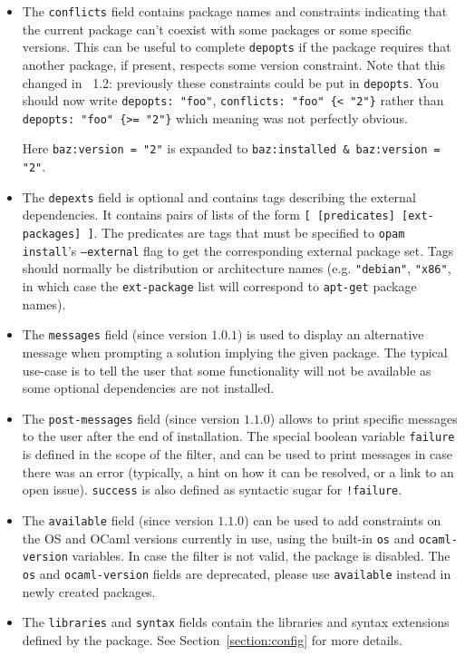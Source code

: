 \documentclass[a4paper,10pt]{article}
\begin{document}
\begin{itemize}
\item The {\tt conflicts} field contains package names and constraints
  indicating that the current package can't coexist with some packages or some
  specific versions. This can be useful to complete {\tt depopts} if the package
  requires that another package, if present, respects some version constraint.
  Note that this changed in \OPAM\ 1.2: previously these constraints could be
  put in {\tt depopts}. You should now write \verb+depopts: "foo"+,
  \verb+conflicts: "foo" {< "2"}+ rather than \verb+depopts: "foo" {>= "2"}+
  which meaning was not perfectly obvious.

Here \verb+baz:version = "2"+ is expanded to
\verb+baz:installed & baz:version = "2"+.

\item The {\tt depexts} field is optional and contains tags describing the
  external dependencies. It contains pairs of lists of the form
  \verb+[ [predicates] [ext-packages] ]+. The predicates are tags that must be
  specified to {\tt opam install}'s {\tt --external} flag to get the
  corresponding external package set. Tags should normally be distribution or
  architecture names (e.g. \verb+"debian"+, \verb+"x86"+, in which case the
  \verb+ext-package+ list will correspond to {\tt apt-get} package names).

\item The {\tt messages} field (since version $1.0.1$) is used to
  display an alternative message when prompting a solution implying
  the given package. The typical use-case is to tell the user that
  some functionality will not be available as some optional
  dependencies are not installed.

\item The {\tt post-messages} field (since version $1.1.0$) allows to print
  specific messages to the user after the end of installation. The special
  boolean variable \verb+failure+ is defined in the scope of the filter, and can
  be used to print messages in case there was an error (typically, a hint on how
  it can be resolved, or a link to an open issue). \verb+success+ is also
  defined as syntactic sugar for \verb+!failure+.

\item The {\tt available} field (since version $1.1.0$) can be used to add
  constraints on the OS and OCaml versions currently in use, using the built-in
  \verb+os+ and \verb+ocaml-version+ variables. In case the filter is not valid,
  the package is disabled. The {\tt os} and {\tt ocaml-version} fields are
  deprecated, please use {\tt available} instead in newly created packages.

\item The {\tt libraries} and {\tt syntax} fields contain the
  libraries and syntax extensions defined by the package. See
  Section~\ref{section:config} for more details.

\end{itemize}
\end{document}
